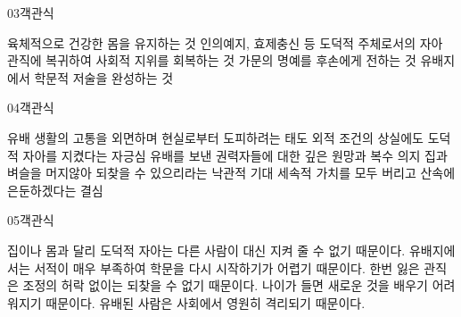 \documentclass[fs85,seriesWit]{korfarm-base}
\begin{document}
\begin{kfQBlock}{03}{객관식}
\begin{kfChoices}
\kfChoice 육체적으로 건강한 몸을 유지하는 것
\kfChoice 인의예지, 효제충신 등 도덕적 주체로서의 자아
\kfChoice 관직에 복귀하여 사회적 지위를 회복하는 것
\kfChoice 가문의 명예를 후손에게 전하는 것
\kfChoice 유배지에서 학문적 저술을 완성하는 것
\end{kfChoices}
\end{kfQBlock}

\begin{kfQBlock}{04}{객관식}
\begin{kfChoices}
\kfChoice 유배 생활의 고통을 외면하며 현실로부터 도피하려는 태도
\kfChoice 외적 조건의 상실에도 도덕적 자아를 지켰다는 자긍심
\kfChoice 유배를 보낸 권력자들에 대한 깊은 원망과 복수 의지
\kfChoice 집과 벼슬을 머지않아 되찾을 수 있으리라는 낙관적 기대
\kfChoice 세속적 가치를 모두 버리고 산속에 은둔하겠다는 결심
\end{kfChoices}
\end{kfQBlock}

\begin{kfQBlock}{05}{객관식}
\begin{kfChoices}
\kfChoice 집이나 몸과 달리 도덕적 자아는 다른 사람이 대신 지켜 줄 수 없기 때문이다.
\kfChoice 유배지에서는 서적이 매우 부족하여 학문을 다시 시작하기가 어렵기 때문이다.
\kfChoice 한번 잃은 관직은 조정의 허락 없이는 되찾을 수 없기 때문이다.
\kfChoice 나이가 들면 새로운 것을 배우기 어려워지기 때문이다.
\kfChoice 유배된 사람은 사회에서 영원히 격리되기 때문이다.
\end{kfChoices}
\end{kfQBlock}

\kfEndMC
\end{document}
